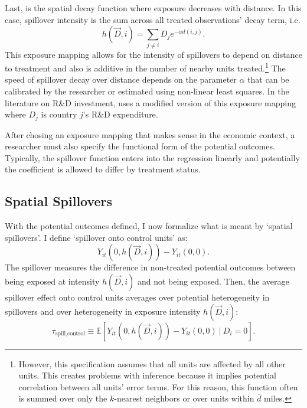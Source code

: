 \documentclass[11pt]{article}
\begin{document}
Last, is the spatial decay function where exposure decreases with distance. In this case, spillover intensity is the sum across all treated observations' decay term, i.e. \begin{equation}\label{eq:h_decay}
    h(\vec{D}, i) = \sum_{j \neq i} D_j e^{-\alpha d(i,j)}.
\end{equation} 
This exposure mapping allows for the intensity of spillovers to depend on distance to treatment and also is additive in the number of nearby units treated.\footnote{However, this specification assumes that all units are affected by all other units. This creates problems with inference because it implies potential correlation between all units' error terms. For this reason, this function often is summed over only the $k$-nearest neighbors or over units within $\bar{d}$ miles.} The speed of spillover decay over distance depends on the parameter $\alpha$ that can be calibrated by the researcher or estimated using non-linear least squares. In the literature on R\&D investment, \citet{Keller_2002} uses a modified version of this exposure mapping where $D_j$ is country $j$'s R\&D expenditure. 

After chosing an exposure mapping that makes sense in the economic context, a researcher must also specify the functional form of the potential outcomes. Typically, the spillover function enters into the regression linearly and potentially the coefficient is allowed to differ by treatment status. 



\subsection{Spatial Spillovers}

With the potential outcomes defined, I now formalize what is meant by `spatial spillovers'. I define `spillover onto control units' as: \[
    Y_{it}(0, h(\vec{D}, i)) - Y_{it}(0, 0).
\] 
The spillover measures the difference in non-treated potential outcomes between being exposed at intensity $h(\vec{D}, i)$ and not being exposed. Then, the average spillover effect onto control units averages over potential heterogeneity in spillovers and over heterogeneity in exposure intensity $h(\vec{D}, i)$: \[
    \tau_{\text{spill,control}} \equiv \mathbb{E} \left[ Y_{it}(0, h(\vec{D}, i)) - Y_{it}(0, 0) \ \vert \ D_i = 0 \right].
\]
\end{document}
